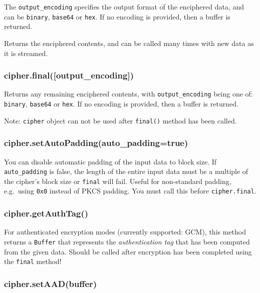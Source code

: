 The \texttt{output\_encoding} specifies the output format of the
enciphered data, and can be
\texttt{\textquotesingle{}binary\textquotesingle{}},
\texttt{\textquotesingle{}base64\textquotesingle{}} or
\texttt{\textquotesingle{}hex\textquotesingle{}}. If no encoding is
provided, then a buffer is returned.

Returns the enciphered contents, and can be called many times with new
data as it is streamed.

\subsubsection{cipher.final({[}output\_encoding{]})}\label{cipher.finaloutputux5fencoding}

Returns any remaining enciphered contents, with
\texttt{output\_encoding} being one of:
\texttt{\textquotesingle{}binary\textquotesingle{}},
\texttt{\textquotesingle{}base64\textquotesingle{}} or
\texttt{\textquotesingle{}hex\textquotesingle{}}. If no encoding is
provided, then a buffer is returned.

Note: \texttt{cipher} object can not be used after \texttt{final()}
method has been called.

\subsubsection{cipher.setAutoPadding(auto\_padding=true)}\label{cipher.setautopaddingautoux5fpaddingtrue}

You can disable automatic padding of the input data to block size. If
\texttt{auto\_padding} is false, the length of the entire input data
must be a multiple of the cipher's block size or \texttt{final} will
fail. Useful for non-standard padding, e.g.~using \texttt{0x0} instead
of PKCS padding. You must call this before \texttt{cipher.final}.

\subsubsection{cipher.getAuthTag()}\label{cipher.getauthtag}

For authenticated encryption modes (currently supported: GCM), this
method returns a \texttt{Buffer} that represents the
\emph{authentication tag} that has been computed from the given data.
Should be called after encryption has been completed using the
\texttt{final} method!

\subsubsection{cipher.setAAD(buffer)}\label{cipher.setaadbuffer}

